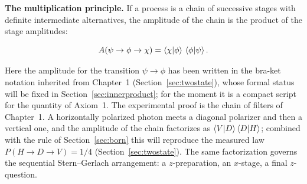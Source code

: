 \textbf{The multiplication principle.} If a process is a chain of successive stages with definite intermediate alternatives, the amplitude of the chain is the product of the stage amplitudes:
\begin{linenomath}
\begin{equation}
    A(\psi \to \phi \to \chi) = \braket{\chi|\phi}\,\braket{\phi|\psi} .
    \label{eq:multiplication-principle}
\end{equation}
\end{linenomath}
Here the amplitude for the transition $\psi \to \phi$ has been written in the bra-ket notation inherited from Chapter~1 (Section~\ref{sec:twostate}), whose formal status will be fixed in Section~\ref{sec:innerproduct}; for the moment it is a compact script for the quantity of Axiom~1. The experimental proof is the chain of filters of Chapter~1. A horizontally polarized photon meets a diagonal polarizer and then a vertical one, and the amplitude of the chain factorizes as $\braket{V|D}\braket{D|H}$; combined with the rule of Section~\ref{sec:born} this will reproduce the measured law $P(H \to D \to V) = 1/4$ (Section~\ref{sec:twostate}). The same factorization governs the sequential Stern--Gerlach arrangement: a $z$-preparation, an $x$-stage, a final $z$-question.

